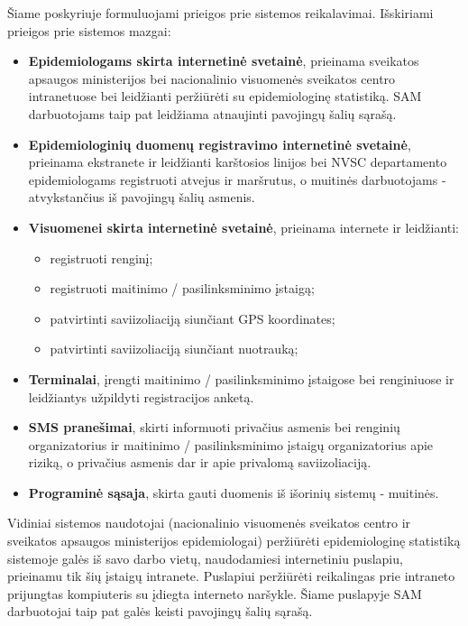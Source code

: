 \documentclass{VUMIFPSkursinis}
\begin{document}
Šiame poskyriuje formuluojami prieigos prie sistemos reikalavimai. Išskiriami prieigos prie sistemos mazgai:
\begin{itemize}
	\item \textbf{Epidemiologams skirta internetinė svetainė}, prieinama sveikatos apsaugos ministerijos bei nacionalinio visuomenės
	      sveikatos centro intranetuose bei leidžianti peržiūrėti su epidemiologinę statistiką. SAM darbuotojams taip pat
	      leidžiama atnaujinti pavojingų šalių sąrašą.
	\item \textbf{Epidemiologinių duomenų registravimo internetinė svetainė}, prieinama ekstranete ir leidžianti karštosios linijos bei NVSC departamento epidemiologams registruoti atvejus ir maršrutus, o muitinės darbuotojams - atvykstančius iš pavojingų šalių asmenis.
	\item \textbf{Visuomenei skirta internetinė svetainė}, prieinama internete ir leidžianti:
	      \begin{itemize}
		      \item registruoti renginį;
		      \item registruoti maitinimo / pasilinksminimo įstaigą;
		      \item patvirtinti saviizoliaciją siunčiant GPS koordinates;
		      \item patvirtinti saviizoliaciją siunčiant nuotrauką;
	      \end{itemize}
	\item \textbf{Terminalai}, įrengti maitinimo / pasilinksminimo įstaigose bei renginiuose ir leidžiantys užpildyti registracijos anketą.
	\item \textbf{SMS pranešimai}, skirti informuoti privačius asmenis bei renginių organizatorius ir maitinimo / pasilinksminimo įstaigų organizatorius apie riziką, o privačius asmenis dar ir apie privalomą saviizoliaciją.
	\item \textbf{Programinė sąsaja}, skirta gauti duomenis iš išorinių sistemų - muitinės.
\end{itemize}

Vidiniai sistemos naudotojai (nacionalinio visuomenės sveikatos centro ir sveikatos apsaugos ministerijos epidemiologai) peržiūrėti epidemiologinę statistiką sistemoje galės
iš savo darbo vietų, naudodamiesi internetiniu puslapiu, prieinamu tik šių įstaigų intranete. Puslapiui peržiūrėti reikalingas prie intraneto prijungtas kompiuteris su įdiegta
interneto naršykle. Šiame puslapyje SAM darbuotojai taip pat galės keisti pavojingų šalių sąrašą.
\end{document}

